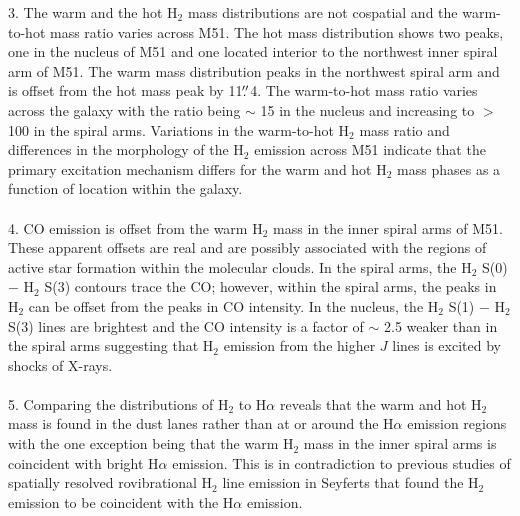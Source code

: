 \documentclass[manuscript]{aastex}
\begin{document}
3.  The warm and the hot $\mathrm{H_2}$ mass distributions are not
cospatial and the warm-to-hot mass ratio varies across M51.  The hot
mass distribution shows two peaks, one in the nucleus of M51 and one
located interior to the northwest inner spiral arm of M51.  The warm
mass distribution peaks in the northwest spiral arm and is offset from
the hot mass peak by 11$\mbox{$.\!\!^{\prime\prime}$}$4.  The warm-to-hot mass ratio varies
across the galaxy with the ratio being $\sim$ 15 in the nucleus and
increasing to $>$ 100 in the spiral arms.  Variations in the
warm-to-hot $\mathrm{H_2}$ mass ratio and differences in the
morphology of the $\mathrm{H_2}$ emission across M51 indicate that the
primary excitation mechanism differs for the warm and hot
$\mathrm{H_2}$ mass phases as a function of location within the
galaxy.\\ \\ 

4. CO emission is offset from the warm $\mathrm{H_2}$ mass in the
inner spiral arms of M51.  These apparent offsets are real and are
possibly associated with the regions of active star formation within
the molecular clouds.  In the spiral arms, the $\mathrm{H_2}$ S(0) $-$
$\mathrm{H_2}$ S(3) contours trace the CO; however, within the spiral
arms, the peaks in $\mathrm{H_2}$ can be offset from the peaks in CO
intensity.  In the nucleus, the $\mathrm{H_2}$ S(1) $-$ $\mathrm{H_2}$
S(3) lines are brightest and the CO intensity is a factor of $\sim$
2.5 weaker than in the spiral arms suggesting that $\mathrm{H_2}$
emission from the higher $J$ lines is excited by shocks of X-rays.\\
\\

5.  Comparing the distributions of $\mathrm{H_2}$ to H$\alpha$ reveals
that the warm and hot $\mathrm{H_2}$ mass is found in the dust lanes
rather than at or around the H$\alpha$ emission regions with the one
exception being that the warm $\mathrm{H_2}$ mass in the inner spiral
arms is coincident with bright H$\alpha$ emission.  This is in
contradiction to previous studies of spatially resolved rovibrational
$\mathrm{H_2}$ line emission in Seyferts that found the $\mathrm{H_2}$
emission to be coincident with the H$\alpha$ emission.\\ \\ 
\end{document}
